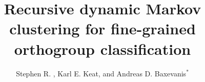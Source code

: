 \documentclass[nogrid]{MBE}%
\begin{document}
\title[RD-MCL]{Recursive dynamic Markov clustering for fine-grained orthogroup classification}


\author[Bond et al.]{Stephen R. , Karl E.
Keat, and Andreas D. Baxevanis$^{\ast}$}

\address{Computational and Statistical Genomics Branch, Division of Intramural Research, National Human Genome Research Institute, National Institutes of Health, 50 South Drive, Bethesda, MD, USA, 20892}


    


\editor{}

\abstract{}



\maketitle
\end{document}
